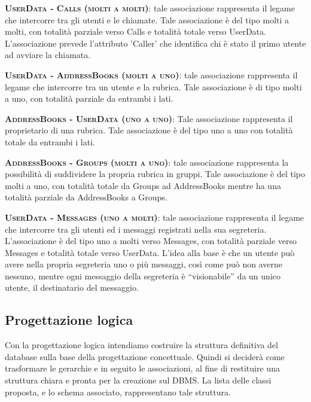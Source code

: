 \begin{description}
	\item{\scshape\bfseries UserData - Calls (molti a molti)}: tale associazione rappresenta il legame che intercorre tra gli utenti e le chiamate. Tale associazione è del tipo molti a molti, con totalità parziale verso Calls e totalità totale verso UserData. L'associazione prevede l'attributo 'Caller' che identifica chi è stato il primo utente ad avviare la chiamata.
	
	\item{\scshape\bfseries UserData - AddressBooks (molti a uno)}: tale associazione rappresenta il legame che intercorre tra un utente e la rubrica. Tale associazione è di tipo molti a uno, con totalità parziale da entrambi i lati.
	
	\item{\scshape\bfseries AddressBooks - UserData (uno a uno)}: Tale associazione rappresenta il proprietario di una rubrica. Tale associazione è del tipo uno a uno con totalità totale da entrambi i lati.
	
	\item{\scshape\bfseries AddressBooks - Groups (molti a uno)}: tale associazione rappresenta la possibilità di suddividere la propria rubrica in gruppi. Tale associazione è del tipo molti a uno, con totalità totale da Groups ad AddressBooks mentre ha una totalità parziale da AddressBooks a Groups.
	
	\item{\scshape\bfseries UserData - Messages (uno a molti)}: tale associazione rappresenta il legame che intercorre tra gli utenti ed i messaggi registrati nella sua segreteria. L'associazione è del tipo uno a molti verso Messages, con totalità parziale verso Messages e totalità totale verso UserData. L'idea alla base è che un utente può avere nella propria segreteria uno o più messaggi, così come può non averne nessuno, mentre ogni messaggio della segreteria è ``visionabile'' da un unico utente, il destinatario del messaggio.
\end{description}

\subsection{Progettazione logica}
Con la progettazione logica intendiamo costruire la struttura definitiva del database sulla base della progettazione concettuale. Quindi si deciderà come trasformare le gerarchie e in seguito le associazioni, al fine di restituire una struttura chiara e pronta per la creazione sul DBMS\@. La lista delle classi proposta, e lo schema associato, rappresentano tale struttura.

